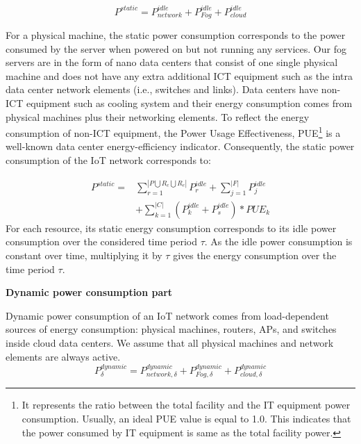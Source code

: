 \documentclass[twocolumn]{article}
\begin{document}
\begin{equation}
P^{static} = P^{idle}_{network} + P^{idle}_{Fog} + P^{idle}_{cloud} 
\label{eq:19}
\end{equation}
\par For a physical machine, the static power consumption corresponds to the power consumed by the server when powered on but not running any services. Our fog servers are in the form of nano data centers that consist of one single physical machine and does not have any extra additional ICT equipment such as the intra data center network elements (i.e., switches and links)\cite{ahvar2019estimating}. Data centers have non-ICT equipment such as cooling system and their energy consumption comes from physical machines plus their networking elements. To reflect the energy consumption of non-ICT equipment, the Power Usage Effectiveness, PUE\footnote{It represents the ratio between the total facility and the IT equipment power consumption. Usually, an ideal PUE value is equal to 1.0. This indicates that the power consumed by IT equipment is same as the total facility power.} is a well-known data center energy-efficiency indicator. 
Consequently, the static power consumption of the IoT network corresponds to:

\begin{equation}
\begin{aligned}
P^{static} = &\sum_{r=1}^{|{P}\bigcup{R_{c}}\bigcup{R_{e}}|}P_{r}^{idle} +\sum_{j=1}^{|{F}|}P_{j}^{idle}\\
			&+\sum_{k=1}^{|{C}|}(P_{k}^{idle} + P_{s}^{idle})*PUE_{k}
\end{aligned}
\label{eq:20}
\end{equation}
For each resource, its static energy consumption corresponds to its idle power consumption over the considered time period $\tau$. As the idle power consumption is constant over time, multiplying it by $\tau$ gives the energy consumption over the time period $\tau$. 

\makebox[4.0cm][c]{}
\parbox[c]{6.0cm}{\textbf{Dynamic power consumption part}}
\par Dynamic power consumption of an IoT network comes from load-dependent sources of energy consumption: physical machines, routers, APs, and switches inside cloud data centers. We assume that all physical machines and network elements are always active.
\begin{equation}
P^{dynamic}_{\delta} = P^{dynamic}_{network,\delta} + P^{dynamic}_{Fog,\delta} + P^{dynamic}_{cloud,\delta}
\label{eq:21}
\end{equation}
\end{document}
